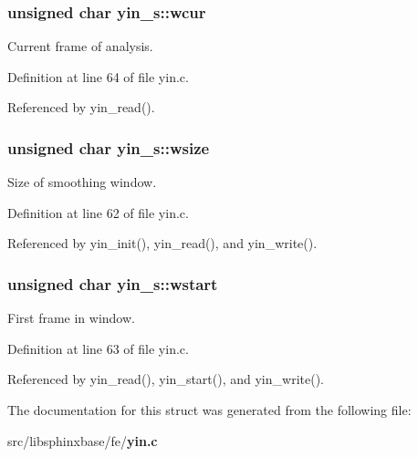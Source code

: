 \subsubsection[{wcur}]{\setlength{\rightskip}{0pt plus 5cm}unsigned char yin\-\_\-s\-::wcur}\label{structyin__s_ab79376deb3761d5d3ae72f727ac25660}


Current frame of analysis. 



Definition at line 64 of file yin.\-c.



Referenced by yin\-\_\-read().

\subsubsection[{wsize}]{\setlength{\rightskip}{0pt plus 5cm}unsigned char yin\-\_\-s\-::wsize}\label{structyin__s_a024d8e9d70f94a7f62457154fb5a4b03}


Size of smoothing window. 



Definition at line 62 of file yin.\-c.



Referenced by yin\-\_\-init(), yin\-\_\-read(), and yin\-\_\-write().

\subsubsection[{wstart}]{\setlength{\rightskip}{0pt plus 5cm}unsigned char yin\-\_\-s\-::wstart}\label{structyin__s_a18481851da6db4df2a469b80c2c5704e}


First frame in window. 



Definition at line 63 of file yin.\-c.



Referenced by yin\-\_\-read(), yin\-\_\-start(), and yin\-\_\-write().



The documentation for this struct was generated from the following file\-:\begin{DoxyCompactItemize}
\item 
src/libsphinxbase/fe/{\bf yin.\-c}\end{DoxyCompactItemize}
